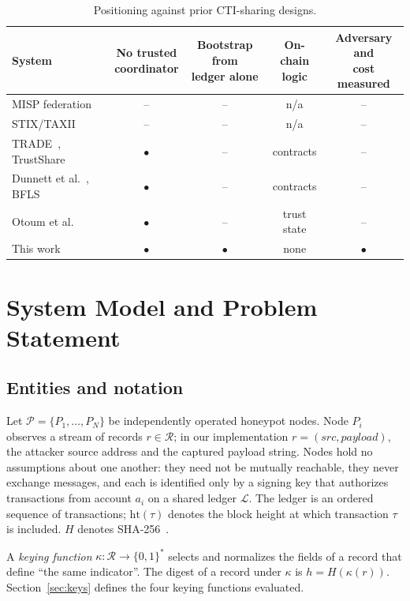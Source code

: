 \documentclass[conference]{IEEEtran}
\newcommand{\Ledger}{\mathcal{L}}
\begin{document}
\begin{table}[!t]
\caption{Positioning against prior CTI-sharing designs.}
\label{tab:compare}
\centering
\scriptsize
\setlength{\tabcolsep}{3pt}
\begin{tabular}{@{}lcccc@{}}
\toprule
System & \shortstack{No trusted\\coordinator} & \shortstack{Bootstrap from\\ledger alone} & \shortstack{On-chain\\logic} & \shortstack{Adversary and\\cost measured} \\
\midrule
MISP federation~\cite{ref1,ref8} & -- & -- & n/a & -- \\
STIX/TAXII~\cite{ref2,ref3} & -- & -- & n/a & -- \\
TRADE~\cite{ref5}, TrustShare~\cite{ref6} & $\bullet$ & -- & contracts & -- \\
Dunnett et al.~\cite{ref7}, BFLS~\cite{ref9} & $\bullet$ & -- & contracts & -- \\
Otoum et al.~\cite{ref10} & $\bullet$ & -- & trust state & -- \\
This work & $\bullet$ & $\bullet$ & none & $\bullet$ \\
\bottomrule
\end{tabular}
\end{table}

\section{System Model and Problem Statement}
\label{sec:model}

\subsection{Entities and notation}
Let $\mathcal{P}=\{P_1,\dots,P_N\}$ be independently operated honeypot nodes. Node $P_i$ observes a stream of records $r\in\mathcal{R}$; in our implementation $r=(\mathit{src},\mathit{payload})$, the attacker source address and the captured payload string. Nodes hold no assumptions about one another: they need not be mutually reachable, they never exchange messages, and each is identified only by a signing key that authorizes transactions from account $a_i$ on a shared ledger $\Ledger$. The ledger is an ordered sequence of transactions; $\mathrm{ht}(\tau)$ denotes the block height at which transaction $\tau$ is included. $H$ denotes SHA-256~\cite{ref17}.

A \emph{keying function} $\kappa:\mathcal{R}\to\{0,1\}^*$ selects and normalizes the fields of a record that define ``the same indicator''. The digest of a record under $\kappa$ is $h=H(\kappa(r))$. Section~\ref{sec:keys} defines the four keying functions evaluated.
\end{document}
